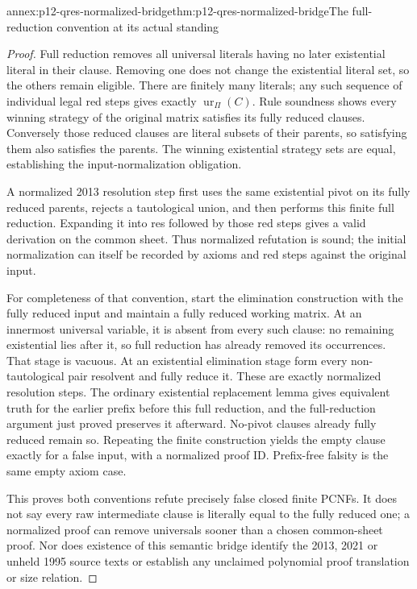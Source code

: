 \begin{annexitem}{annex:p12-qres-normalized-bridge}{thm:p12-qres-normalized-bridge}{The full-reduction convention at its actual standing}
\begin{proof}
Full reduction removes all universal literals having no later existential
literal in their clause.  Removing one does not change the existential
literal set, so the others remain eligible.  There are finitely many
literals; any such sequence of individual legal red steps gives exactly
\(\operatorname{ur}_{\Pi}(C)\).  Rule soundness shows every winning
strategy of the original matrix satisfies its fully reduced clauses.
Conversely those reduced clauses are literal subsets of their parents,
so satisfying them also satisfies the parents.  The winning existential
strategy sets are equal, establishing the input-normalization obligation.

A normalized 2013 resolution step first uses the same existential pivot
on its fully reduced parents, rejects a tautological union, and then performs
this finite full reduction.  Expanding it into res followed by those red
steps gives a valid derivation on the common sheet.  Thus normalized
refutation is sound; the initial normalization can itself be recorded by
axioms and red steps against the original input.

For completeness of that convention, start the elimination construction
with the fully reduced input and maintain a fully reduced working matrix.
At an innermost universal variable, it is absent from every such clause:
no remaining existential lies after it, so full reduction has already
removed its occurrences.  That stage is vacuous.  At an existential
elimination stage form every non-tautological pair resolvent and fully
reduce it.  These are exactly normalized resolution steps.  The ordinary
existential replacement lemma gives equivalent truth for the earlier
prefix before this full reduction, and the full-reduction argument just
proved preserves it afterward.  No-pivot clauses already fully reduced
remain so.  Repeating the finite construction yields the empty clause
exactly for a false input, with a normalized proof ID.  Prefix-free falsity
is the same empty axiom case.

This proves both conventions refute precisely false closed finite PCNFs.
It does not say every raw intermediate clause is literally equal to the
fully reduced one; a normalized proof can remove universals sooner than
a chosen common-sheet proof.  Nor does existence of this semantic bridge
identify the 2013, 2021 or unheld 1995 source texts or establish any
unclaimed polynomial proof translation or size relation.
\end{proof}
\end{annexitem}

